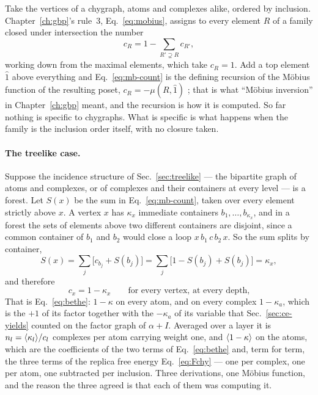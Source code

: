 Take the vertices of a chygraph, atoms and complexes alike, ordered by
inclusion. Chapter~\ref{ch:gbp}'s rule~3, Eq.~\eqref{eq:mobius}, assigns to
every element $R$ of a family closed under intersection the number
\begin{equation}
  c_{R}=1-\sum_{R'\supsetneq R}c_{R'},
  \label{eq:mb-count}
\end{equation}
working down from the maximal elements, which take $c_{R}=1$. Add a top
element $\hat1$ above everything and Eq.~\eqref{eq:mb-count} is the defining
recursion of the M\"obius function of the resulting poset, $c_{R}=-\mu(R,\hat1)$
\citep{pakzad2005}; that is what ``M\"obius inversion'' in
Chapter~\ref{ch:gbp} meant, and the recursion is how it is computed. So far
nothing is specific to chygraphs. What is specific is what happens when the
family is the inclusion order itself, with no closure taken.

\paragraph{The treelike case.} Suppose the incidence structure of
Sec.~\ref{sec:treelike} --- the bipartite graph of atoms and complexes, or
of complexes and their containers at every level --- is a forest. Let
$S(x)$ be the sum in Eq.~\eqref{eq:mb-count}, taken over every element
strictly above $x$. A vertex $x$ has $\kappa_{x}$ immediate containers
$b_{1},\dots,b_{\kappa_{x}}$, and in a forest the sets of elements above two
different containers are disjoint, since a common container of $b_{1}$ and
$b_{2}$ would close a loop $x\,b_{1}\,c\,b_{2}\,x$. So the sum splits by
container,
\begin{equation}
  S(x)=\sum_{j}\bigl[c_{b_{j}}+S(b_{j})\bigr]
      =\sum_{j}\bigl[1-S(b_{j})+S(b_{j})\bigr]=\kappa_{x},
  \label{eq:mb-forest}
\end{equation}
and therefore
\begin{equation}
  c_{x}=1-\kappa_{x}
  \qquad\text{for every vertex, at every depth,}
  \label{eq:mb-treecount}
\end{equation}
That is Eq.~\eqref{eq:bethe}: $1-\kappa$ on every atom, and on every complex
$1-\kappa_{a}$, which is the $+1$ of its factor together with the
$-\kappa_{a}$ of its variable that Sec.~\ref{sec:ce-yields} counted on the
factor graph of $\alpha+I$. Averaged over a layer it is $n_{l}=\langle \kappa_{l} \rangle/c_{l}$
complexes per atom carrying weight one, and $\langle 1-\kappa \rangle$ on the atoms,
which are the coefficients of the two terms of Eq.~\eqref{eq:bethe} and,
term for term, the three terms of the replica free energy
Eq.~\eqref{eq:Fchy} --- one per complex, one per atom, one subtracted per
inclusion. Three derivations, one M\"obius function, and the reason the three
agreed is that each of them was computing it.

